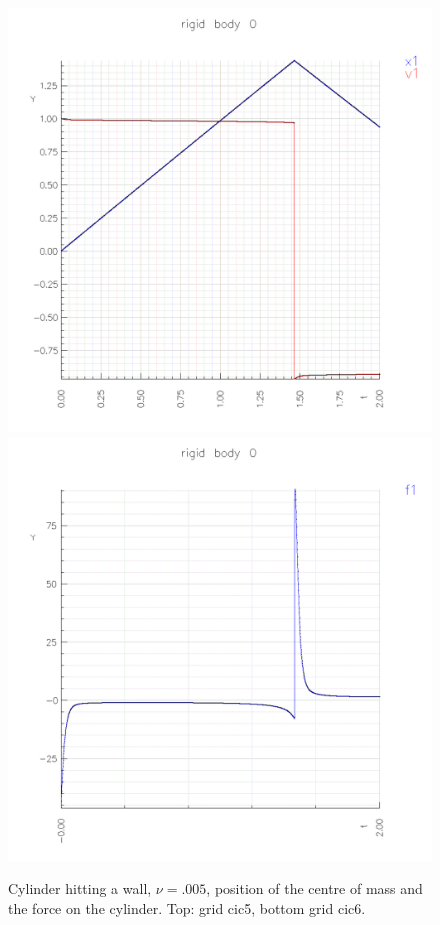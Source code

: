 {\begin{figure}
\begin{center}
% 
\includegraphics[width=\figWidth]{figures/collide6-nu0125-rb-x1}  
\includegraphics[width=\figWidth]{figures/collide6-nu0125-rb-f1}  
\end{center}
\caption{Cylinder hitting a wall, $\nu=.005$, position of the centre of mass and the force on the cylinder.
    Top: grid cic5, bottom grid cic6.}
\end{figure}
}

